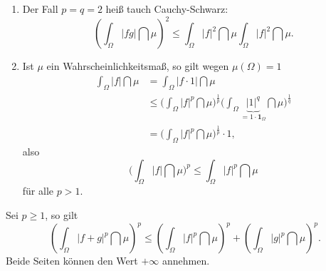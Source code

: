 \marginpar{\textcolor{red}{Vorlesung 17}}

\begin{korollar}\abs
	\begin{enumerate}[label=(\roman*)]
		\item Der Fall $p=q=2$ hei\ss{} tauch Cauchy-Schwarz:
		\[ \left(\int_{\Omega} |fg| \dint\mu  \right)^2 \leq \int_{\Omega} |f|^2 \dint\mu \int_{\Omega} |f|^2 \dint\mu. \]
		\item Ist $\mu$ ein Wahrscheinlichkeitsmaß, so gilt wegen $\mu(\Omega) = 1$
		\begin{align*}
		\int_{\Omega} |f| \dint\mu &= \int_{\Omega} |f \cdot 1| \dint\mu\\
		& \leq \Bigg( \int_{\Omega} |f|^p \dint \mu \Bigg)^{\frac{1}{p}} \Bigg( \int_{\Omega} \underbrace{|1|^q}_{= 1 \cdot \mathbf{1}_{\Omega}} \dint \mu \Bigg)^{\frac{1}{q}}\\ 
		&= \Bigg( \int_{\Omega} |f|^p \dint \mu \Bigg)^{\frac{1}{p}} \cdot 1,
		\end{align*}
		also
		\[ \Bigg(\int_{\Omega} |f| \dint\mu\Bigg)^{p}  \leq  \int_{\Omega} |f|^p \dint \mu \]
		für alle $p > 1$.
	\end{enumerate}
\end{korollar}

\begin{satz}\label{minkowski}
	Sei $p \geq 1$, so gilt
	\[ \left( \int_{\Omega} |f+g|^p \dint \mu \right)^p \leq \left( \int_{\Omega} |f|^p \dint \mu \right)^p + \left( \int_{\Omega} |g|^p \dint \mu \right)^p. \]
	Beide Seiten k\"onnen den Wert $+\infty$ annehmen.
\end{satz}

